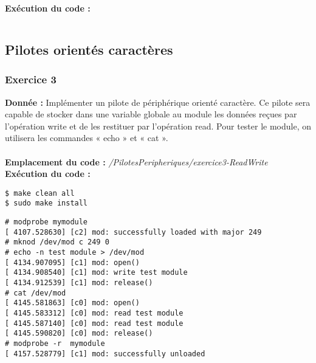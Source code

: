 \textbf{Exécution du code : } \\
\begin{lstlisting}

\end{lstlisting}

\subsection{Pilotes orientés caractères}
\subsubsection{Exercice 3}
\textbf{Donnée : } Implémenter	un	pilote	de	périphérique	orienté	caractère.	Ce	pilote	sera	capable	de	stocker	dans	
une	variable	globale	au	module	les	données	reçues	par	l’opération	write et	de	les	restituer	par	
l’opération	read. Pour	tester	le	module,	on	utilisera	les commandes « echo » et	« cat ».\\\\
\textbf{Emplacement du code : } \textit{/PilotesPeripheriques/exercice3-ReadWrite}\\

\textbf{Exécution du code : } \\
\begin{lstlisting}
$ make clean all
$ sudo make install
\end{lstlisting}
\begin{lstlisting}
# modprobe mymodule                                                             
[ 4107.528630] [c2] mod: successfully loaded with major 249                     
# mknod /dev/mod c 249 0                                                        
# echo -n test module > /dev/mod                                                
[ 4134.907095] [c1] mod: open()                                                 
[ 4134.908540] [c1] mod: write test module                                      
[ 4134.912539] [c1] mod: release()                                              
# cat /dev/mod                                                                  
[ 4145.581863] [c0] mod: open()                                                 
[ 4145.583312] [c0] mod: read test module                                       
[ 4145.587140] [c0] mod: read test module                                       
[ 4145.590820] [c0] mod: release()                                              
# modprobe -r  mymodule                                                         
[ 4157.528779] [c1] mod: successfully unloaded   
\end{lstlisting}

